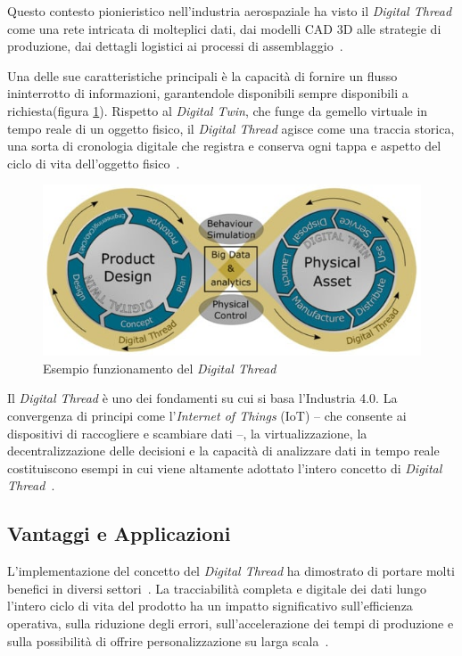 Questo contesto pionieristico nell'industria aerospaziale ha visto il \emph{Digital Thread} come una rete intricata di molteplici dati, dai modelli CAD 3D alle strategie di produzione, dai dettagli logistici ai processi di assemblaggio~\cite{Thread2}.

Una delle sue caratteristiche principali è la capacità di fornire un flusso ininterrotto di informazioni, garantendole disponibili sempre disponibili a richiesta(figura \ref{fig:dth_example}). Rispetto al \emph{Digital Twin}, che funge da gemello virtuale in tempo reale di un oggetto fisico, il \emph{Digital Thread} agisce come una traccia storica, una sorta di cronologia digitale che registra e conserva ogni tappa e aspetto del ciclo di vita dell'oggetto fisico~\cite{Thread3}.

\begin{figure}[h]
\begin{center}
\includegraphics[width=12cm]{images/Example_DTH.jpg}
\caption[Esempio funzionamento Digital Thread]{Esempio funzionamento del \emph{Digital Thread}~\cite{Thread3}}\label{fig:dth_example}
\end{center}
\end{figure}

\newpage

Il \emph{Digital Thread} è uno dei fondamenti su cui si basa l'Industria 4.0. La convergenza di principi come l'\emph{Internet of Things} (IoT) – che consente ai dispositivi di raccogliere e scambiare dati –, la virtualizzazione, la decentralizzazione delle decisioni e la capacità di analizzare dati in tempo reale costituiscono esempi in cui viene altamente adottato l'intero concetto di \emph{Digital Thread}~\cite{Thread}.

\subsection{Vantaggi e Applicazioni}

L'implementazione del concetto del \emph{Digital Thread} ha dimostrato di portare molti benefici in diversi settori~\cite{Thread4}. La tracciabilità completa e digitale dei dati lungo l'intero ciclo di vita del prodotto ha un impatto significativo sull'efficienza operativa, sulla riduzione degli errori, sull'accelerazione dei tempi di produzione e sulla possibilità di offrire personalizzazione su larga scala~\cite{Thread}.

